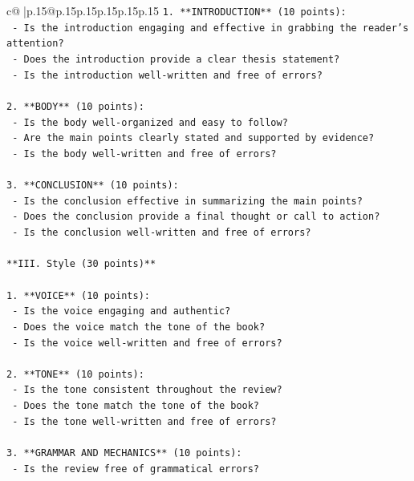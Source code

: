 \documentclass{article}
\begin{document}
{\begin{supertabular}{c@{$\;$}|p{.15\linewidth}@{}p{.15\linewidth}p{.15\linewidth}p{.15\linewidth}p{.15\linewidth}p{.15\linewidth}}
{{{\texttt{1. **INTRODUCTION** (10 points):} \\
\texttt{   {-} Is the introduction engaging and effective in grabbing the reader's attention?} \\
\texttt{   {-} Does the introduction provide a clear thesis statement?} \\
\texttt{   {-} Is the introduction well{-}written and free of errors?} \\
\\ 
\texttt{2. **BODY** (10 points):} \\
\texttt{   {-} Is the body well{-}organized and easy to follow?} \\
\texttt{   {-} Are the main points clearly stated and supported by evidence?} \\
\texttt{   {-} Is the body well{-}written and free of errors?} \\
\\ 
\texttt{3. **CONCLUSION** (10 points):} \\
\texttt{   {-} Is the conclusion effective in summarizing the main points?} \\
\texttt{   {-} Does the conclusion provide a final thought or call to action?} \\
\texttt{   {-} Is the conclusion well{-}written and free of errors?} \\
\\ 
\texttt{**III. Style (30 points)**} \\
\\ 
\texttt{1. **VOICE** (10 points):} \\
\texttt{   {-} Is the voice engaging and authentic?} \\
\texttt{   {-} Does the voice match the tone of the book?} \\
\texttt{   {-} Is the voice well{-}written and free of errors?} \\
\\ 
\texttt{2. **TONE** (10 points):} \\
\texttt{   {-} Is the tone consistent throughout the review?} \\
\texttt{   {-} Does the tone match the tone of the book?} \\
\texttt{   {-} Is the tone well{-}written and free of errors?} \\
\\ 
\texttt{3. **GRAMMAR AND MECHANICS** (10 points):} \\
\texttt{   {-} Is the review free of grammatical errors?} \\
}}}
\end{supertabular}}
\end{document}
